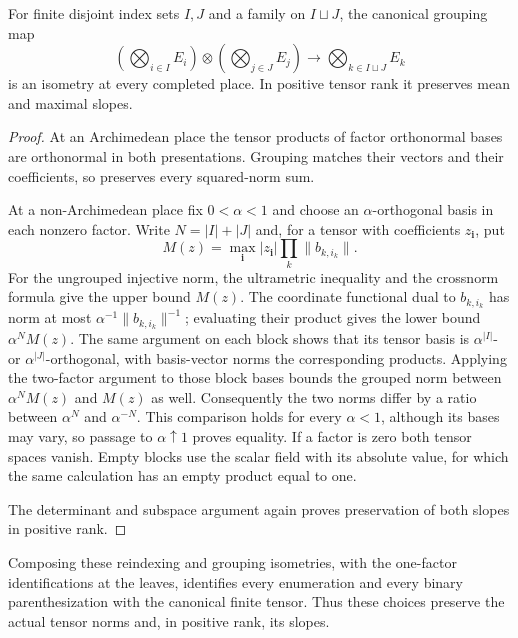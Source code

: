 \begin{lemma}
\label{lem:finite-tensor-grouping-isometry}
\leanok
For finite disjoint index sets $I,J$ and a family on $I\sqcup J$,
the canonical grouping map
\[
 \left(\bigotimes_{i\in I}E_i\right)\otimes
 \left(\bigotimes_{j\in J}E_j\right)
 \longrightarrow\bigotimes_{k\in I\sqcup J}E_k
\]
is an isometry at every completed place. In positive tensor rank it
preserves mean and maximal slopes.
\end{lemma}
\begin{proof}
At an Archimedean place the tensor products of factor orthonormal bases
are orthonormal in both presentations. Grouping matches their vectors
and their coefficients, so preserves every squared-norm sum.

At a non-Archimedean place fix $0<\alpha<1$ and choose an
$\alpha$-orthogonal basis in each nonzero factor. Write $N=|I|+|J|$ and,
for a tensor with coefficients $z_{\mathbf i}$, put
\[
 M(z)=\max_{\mathbf i}|z_{\mathbf i}|
                    \prod_k\|b_{k,i_k}\|.
\]
For the ungrouped injective norm, the ultrametric inequality and the
crossnorm formula give the upper bound $M(z)$. The coordinate functional
dual to $b_{k,i_k}$ has norm at most
$\alpha^{-1}\|b_{k,i_k}\|^{-1}$; evaluating their product gives the
lower bound $\alpha^N M(z)$. The same argument on each block shows that
its tensor basis is $\alpha^{|I|}$- or $\alpha^{|J|}$-orthogonal,
with basis-vector norms the corresponding products. Applying the two-factor
argument to those block bases bounds the grouped norm between
$\alpha^N M(z)$ and $M(z)$ as well. Consequently the two norms differ
by a ratio between $\alpha^N$ and $\alpha^{-N}$. This comparison holds
for every $\alpha<1$, although its bases may vary, so passage to
$\alpha\uparrow1$ proves equality. If a factor is zero both tensor
spaces vanish. Empty blocks use the scalar field with its absolute value,
for which the same calculation has an empty product equal to one.

The determinant and subspace argument again proves preservation of
both slopes in positive rank.
\end{proof}

Composing these reindexing and grouping isometries, with the one-factor
identifications at the leaves, identifies every enumeration and every
binary parenthesization with the canonical finite tensor. Thus these
choices preserve the actual tensor norms and, in positive rank, its slopes.

